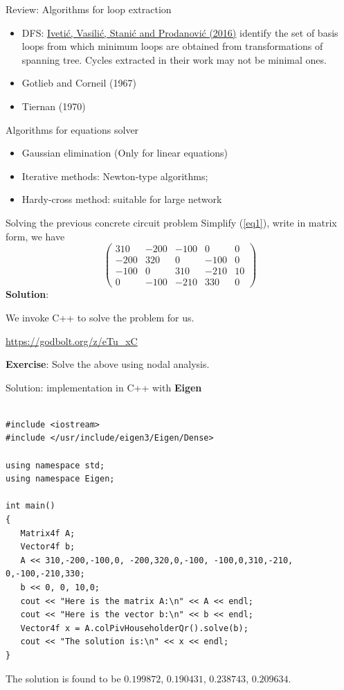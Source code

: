 \documentclass[xcolor=dvipsnames]{beamer}
\begin{document}
\begin{frame}{Review: Algorithms for loop extraction}
	\begin{itemize}
		\item DFS: \href{https://iwaponline.com/jh/article/18/1/33/29990/Speeding-up-the-water-distribution-network-design}{Iveti\'c, Vasili\'c, Stani\'c and Prodanovi\'c (2016)} identify the set of basis loops from which
		minimum loops are obtained from transformations of spanning tree. Cycles extracted in their work may not 
		be minimal ones.
		\item Gotlieb and Corneil (1967)
		\item Tiernan (1970)
	\end{itemize}
\end{frame}

\begin{frame}{Algorithms for equations solver}
\begin{itemize}
	\item Gaussian elimination (Only for linear equations)
	\item Iterative methods: {\color{red}Newton-type} algorithms;
	\item Hardy-cross method: suitable for large network
\end{itemize}
	
\end{frame}

\begin{frame}{Solving the previous concrete circuit problem}
	Simplify (\ref{eq1}), write in matrix form, we have
	\[
\left(
	\begin{array}{cccc|c}
	  310 & -200 & -100 & 0 & 0\\
	  -200 & 320 & 0 & -100 & 0\\
	  -100 & 0 & 310 & -210 & 10\\
	  0 & -100 & -210 & 330 & 0
	\end{array}	
\right)
\]
\textbf{Solution}: 

We invoke C++ to solve the problem for us.

\url{https://godbolt.org/z/eTu_xC}

\textbf{Exercise}: Solve the above using nodal analysis.

\end{frame}

\begin{frame}[fragile,shrink=30]{Solution: implementation in C++ with \textbf{Eigen}}
\begin{verbatim}

#include <iostream>
#include </usr/include/eigen3/Eigen/Dense>
 
using namespace std;
using namespace Eigen;
 
int main()
{
   Matrix4f A;
   Vector4f b;
   A << 310,-200,-100,0, -200,320,0,-100, -100,0,310,-210, 0,-100,-210,330;
   b << 0, 0, 10,0;
   cout << "Here is the matrix A:\n" << A << endl;
   cout << "Here is the vector b:\n" << b << endl;
   Vector4f x = A.colPivHouseholderQr().solve(b);
   cout << "The solution is:\n" << x << endl;
}
\end{verbatim}
	The solution is found to be $0.199872$, $0.190431$, $0.238743$, $0.209634$.
\end{frame}
\end{document}
